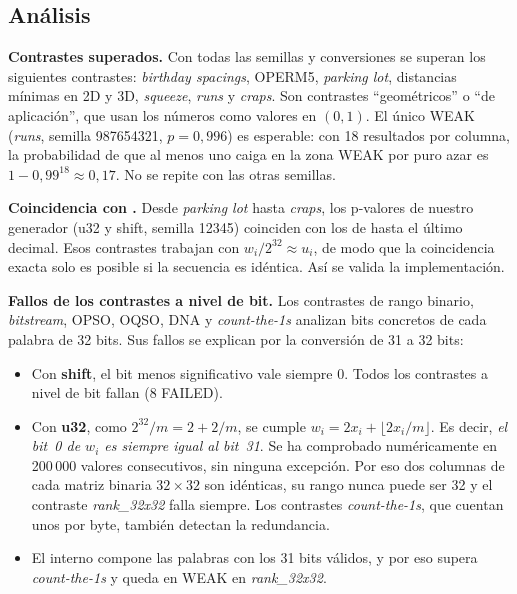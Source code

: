 \documentclass[a4paper,11pt]{article}
\begin{document}
\subsection{Análisis}

\textbf{Contrastes superados.} Con todas las semillas y conversiones se
superan los siguientes contrastes: \emph{birthday spacings}, OPERM5,
\emph{parking lot}, distancias mínimas en 2D y 3D, \emph{squeeze},
\emph{runs} y \emph{craps}. Son contrastes \enquote{geométricos} o \enquote{de
aplicación}, que usan los números como valores en $(0,1)$. El único WEAK
(\emph{runs}, semilla 987654321, $p=0{,}996$) es esperable: con 18 resultados
por columna, la probabilidad de que al menos uno caiga en la zona WEAK por puro
azar es $1-0{,}99^{18}\approx 0{,}17$. No se repite con las otras semillas.

\textbf{Coincidencia con .} Desde \emph{parking lot} hasta
\emph{craps}, los p-valores de nuestro generador (u32 y shift, semilla 12345)
coinciden con los de  hasta el último decimal. Esos contrastes
trabajan con $w_i/2^{32}\approx u_i$, de modo que la coincidencia exacta solo
es posible si la secuencia es idéntica. Así se valida la implementación.

\textbf{Fallos de los contrastes a nivel de bit.} Los contrastes de rango
binario, \emph{bitstream}, OPSO, OQSO, DNA y \emph{count-the-1s} analizan bits
concretos de cada palabra de 32 bits. Sus fallos se explican por la conversión
de 31 a 32 bits:
\begin{itemize}
  \item Con \textbf{shift}, el bit menos significativo vale siempre 0. Todos
        los contrastes a nivel de bit fallan (8 FAILED).
  \item Con \textbf{u32}, como $2^{32}/m = 2 + 2/m$, se cumple
        $w_i = 2x_i + \lfloor 2x_i/m \rfloor$. Es decir, \emph{el bit~0 de
        $w_i$ es siempre igual al bit~31}. Se ha comprobado numéricamente en
        200\,000 valores consecutivos, sin ninguna excepción. Por eso dos columnas
        de cada matriz binaria $32\times32$ son idénticas, su rango nunca puede
        ser 32 y el contraste \emph{rank\_32x32} falla siempre. Los contrastes
        \emph{count-the-1s}, que cuentan unos por byte, también detectan la
        redundancia.
  \item El  interno compone las palabras con los 31 bits válidos,
        y por eso supera \emph{count-the-1s} y queda en WEAK en
        \emph{rank\_32x32}.
\end{itemize}
\end{document}
